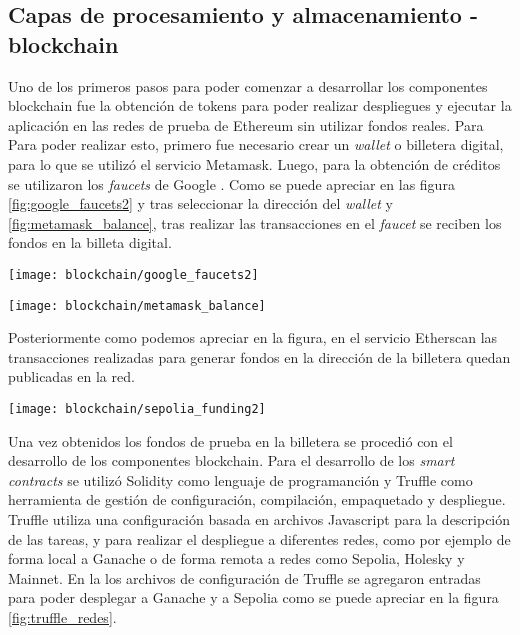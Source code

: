 \subsection{Capas de procesamiento y almacenamiento - blockchain}

Uno de los primeros pasos para poder comenzar a desarrollar los componentes blockchain fue la obtención de tokens para poder realizar despliegues y ejecutar la aplicación en las redes de prueba de Ethereum sin utilizar fondos reales. Para Para poder realizar esto, primero fue necesario crear un \textit{wallet} o billetera digital, para lo que se utilizó el servicio Metamask. Luego, para la obtención de créditos se utilizaron los \textit{faucets} de Google \citep{google_faucets}. Como se puede apreciar en las figura \ref{fig:google_faucets2} y tras seleccionar la dirección del \textit{wallet} y \ref{fig:metamask_balance}, tras realizar las transacciones en el \textit{faucet} se reciben los fondos en la billeta digital. 

\begin{center}
   \texttt{[image: blockchain/google\_faucets2]}
   \label{fig:google_faucets2}
\end{center}

\begin{center}
   \texttt{[image: blockchain/metamask\_balance]}
   \label{fig:metamask_balance}
\end{center}

Posteriormente como podemos apreciar en la figura, en el servicio Etherscan las transacciones realizadas para generar fondos en la dirección de la billetera quedan publicadas en la red.


\begin{center}
   \texttt{[image: blockchain/sepolia\_funding2]}
   \label{fig:sepolia_funding2}
\end{center}


Una vez obtenidos los fondos de prueba en la billetera se procedió con el desarrollo de los componentes blockchain. Para el desarrollo de los \textit{smart contracts} se utilizó Solidity como lenguaje de programanción y Truffle como herramienta de gestión de configuración, compilación, empaquetado y despliegue. Truffle utiliza una configuración basada en archivos Javascript para la descripción de las tareas, y para realizar el despliegue a diferentes redes, como por ejemplo de forma local a Ganache o de forma remota a redes como Sepolia, Holesky y Mainnet. En la los archivos de configuración de Truffle se agregaron entradas para poder desplegar a Ganache y a Sepolia como se puede apreciar en la figura \ref{fig:truffle_redes}.

